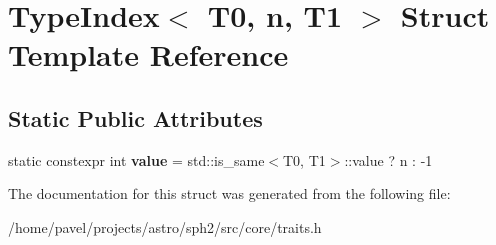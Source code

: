 \hypertarget{structTypeIndex_3_01T0_00_01n_00_01T1_01_4}{}\section{Type\+Index$<$ T0, n, T1 $>$ Struct Template Reference}
\label{structTypeIndex_3_01T0_00_01n_00_01T1_01_4}
\subsection*{Static Public Attributes}
\begin{DoxyCompactItemize}
\item 
\hypertarget{structTypeIndex_3_01T0_00_01n_00_01T1_01_4_aea814bcf31534cdbb86a88726083d284}{}\label{structTypeIndex_3_01T0_00_01n_00_01T1_01_4_aea814bcf31534cdbb86a88726083d284} 
static constexpr int {\bfseries value} = std\+::is\+\_\+same$<$T0, T1$>$\+::value ? n \+: -\/1
\end{DoxyCompactItemize}


The documentation for this struct was generated from the following file\+:\begin{DoxyCompactItemize}
\item 
/home/pavel/projects/astro/sph2/src/core/traits.\+h\end{DoxyCompactItemize}
